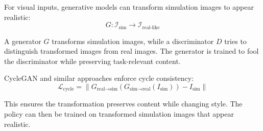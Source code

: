For visual inputs, generative models can transform simulation images to appear realistic:
\begin{equation}
G: \mathcal{I}_{\text{sim}} \to \mathcal{I}_{\text{real-like}}
\end{equation}

A generator $G$ transforms simulation images, while a discriminator $D$ tries to distinguish transformed images from real images. The generator is trained to fool the discriminator while preserving task-relevant content.

CycleGAN and similar approaches enforce cycle consistency:
\begin{equation}
\mathcal{L}_{\text{cycle}} = \| G_{\text{real}\to\text{sim}}(G_{\text{sim}\to\text{real}}(I_{\text{sim}})) - I_{\text{sim}} \|
\end{equation}

This ensures the transformation preserves content while changing style. The policy can then be trained on transformed simulation images that appear realistic.

